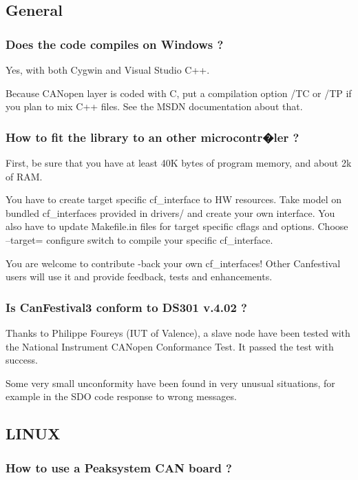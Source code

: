 \documentclass[12pt,english,a4paper]{book}
\newcommand{\canopen}{CANopen }
\begin{document}
\subsection{General}


\subsubsection{Does the code compiles on Windows ?}

Yes, with both Cygwin and Visual Studio C++. 

Because \canopen layer is coded with C, put a compilation option
/TC or /TP if you plan to mix C++ files. See the MSDN documentation
about that.


\subsubsection{How to fit the library to an other microcontr�ler ?}

First, be sure that you have at least 40K bytes of program memory,
and about 2k of RAM.

You have to create target specific cf_interface to HW resources. Take
model on bundled cf_interfaces provided in drivers/ and create your own
interface. You also have to update Makefile.in files for target specific
cflags and options. Choose {--}target= configure switch to compile
your specific cf_interface.

You are welcome to contribute -back your own cf_interfaces! Other Canfestival
users will use it and provide feedback, tests and enhancements.


\subsubsection{Is CanFestival3 conform to DS301 v.4.02 ?}

Thanks to Philippe Foureys (IUT of Valence), a slave node have been
tested with the National Instrument \canopen Conformance Test. It
passed the test with success.

Some very small unconformity have been found in very unusual situations,
for example in the SDO code response to wrong messages.


\subsection{LINUX}


\subsubsection{How to use a Peaksystem CAN board ?}
\end{document}
